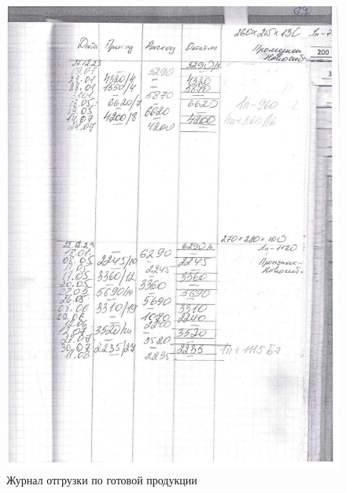 \begin{figure}
\begin{center}
  \includegraphics[height=0.8\textheight, keepaspectratio]{Pics/d29_2.jpg}
\end{center}
  \caption{Журнал отгрузки по готовой продукции}
  \label{pic:d29}
\end{figure}

